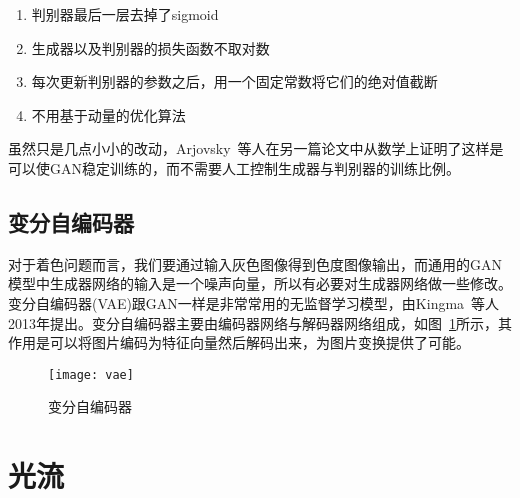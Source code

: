   \begin{enumerate}
    \item 判别器最后一层去掉了sigmoid
    \item 生成器以及判别器的损失函数不取对数
    \item 每次更新判别器的参数之后，用一个固定常数将它们的绝对值截断
    \item 不用基于动量的优化算法
  \end{enumerate}

  虽然只是几点小小的改动，Arjovsky~\cite{DBLP:journals/corr/ArjovskyB17}等人在另一篇论文中从数学上证明了这样是可以使GAN稳定训练的，而不需要人工控制生成器与判别器的训练比例。

\subsection{变分自编码器}
\label{sec:2-vae}
  
  对于着色问题而言，我们要通过输入灰色图像得到色度图像输出，而通用的GAN模型中生成器网络的输入是一个噪声向量，所以有必要对生成器网络做一些修改。变分自编码器(VAE)跟GAN一样是非常常用的无监督学习模型，由Kingma~\cite{DBLP:journals/corr/KingmaW13}等人2013年提出。变分自编码器主要由编码器网络与解码器网络组成，如图~\ref{fig:vae}所示，其作用是可以将图片编码为特征向量然后解码出来，为图片变换提供了可能。

  \begin{figure}[H]
    \centering
    \texttt{[image: vae]}
    \caption{变分自编码器}
    \label{fig:vae}
  \end{figure}

\section{光流}
\label{sec:2-optical-flow}

